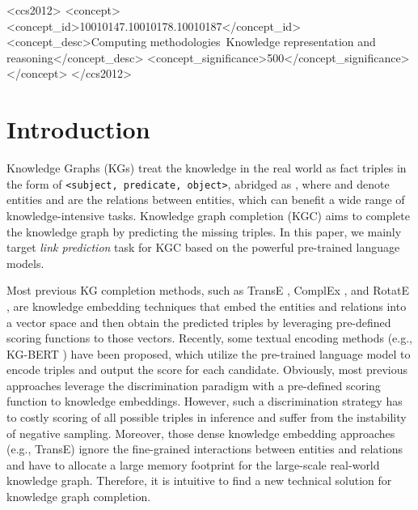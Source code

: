 \documentclass[sigconf]{acmart}
\begin{document}
\begin{CCSXML}
<ccs2012>
   <concept>
       <concept_id>10010147.10010178.10010187</concept_id>
       <concept_desc>Computing methodologies~Knowledge representation and reasoning</concept_desc>
       <concept_significance>500</concept_significance>
       </concept>
 </ccs2012>
\end{CCSXML}






\maketitle

\section{Introduction}

Knowledge Graphs (KGs) treat the knowledge in the real world as fact triples in the form of \texttt{<subject, predicate, object>}, abridged as , where  and  denote entities and  are the relations between entities, which can benefit a wide range of knowledge-intensive tasks.
Knowledge graph completion (KGC) aims to complete the knowledge graph by predicting the missing triples.
In this paper, we mainly target \textit{link prediction} task for KGC based on the powerful pre-trained language models.

Most previous KG completion methods, such as TransE \cite{Bordes:TransE}, ComplEx \cite{complex}, and RotatE \cite{RotatE}, are knowledge embedding techniques that embed the entities and relations into a vector space and then obtain the predicted triples by leveraging pre-defined scoring functions to those vectors.
Recently, some textual encoding methods (e.g., KG-BERT \cite{kgbert}) have been proposed, which utilize the pre-trained language model to encode triples and output the score for each candidate.
Obviously, most previous approaches leverage the discrimination paradigm with a pre-defined scoring function to knowledge embeddings. 
However, such a discrimination strategy has to costly scoring of all possible triples in inference and suffer from the instability of negative sampling. 
Moreover, those dense knowledge embedding approaches (e.g., TransE) ignore the fine-grained interactions between entities and relations and have to allocate a large memory footprint for the large-scale real-world knowledge graph. 
Therefore, it is intuitive to find a new technical solution for knowledge graph completion.
\end{document}
